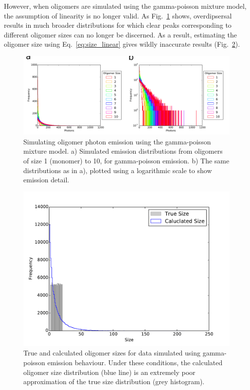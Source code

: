 However, when oligomers are simulated using the gamma-poisson mixture model, the assumption of linearity is no longer valid. As Fig.~\ref{fig:gamma_poisson_size_photons} shows, overdipsersal results in much broader distributions for which clear peaks corresponding to different oligomer sizes can no longer be discerned. As a result, estimating the oligomer size using Eq.~\ref{eq:size_linear} gives wildly inaccurate results (Fig.~\ref{fig:gamma_poisson_size_photons_uniform}).

\begin{figure}
   \begin{center}
      \includegraphics*[clip=true, width=6.5in]{sizing/gamma_poisson_size_photons.pdf}
      \caption{Simulating oligomer photon emission using the gamma-poisson mixture model. a) Simulated emission distributions from oligomers of size 1 (monomer) to 10, for gamma-poisson emission. b) The same distributions as in a), plotted using a logarithmic scale to show emission detail.}
      \label{fig:gamma_poisson_size_photons}
   \end{center}
\end{figure}

\begin{figure}
   \begin{center}
      \includegraphics*[clip=true, width=6in]{sizing/True_vs_Measured_oligomer_events_uniform_100000_hist.pdf}
      \caption{True and calculated oligomer sizes for data simulated using gamma-poisson emission behaviour. Under these conditions, the calculated oligomer size distribution (blue line) is an extremely poor approximation of the true size distribution (grey histogram).}
      \label{fig:gamma_poisson_size_photons_uniform}
   \end{center}
\end{figure}

